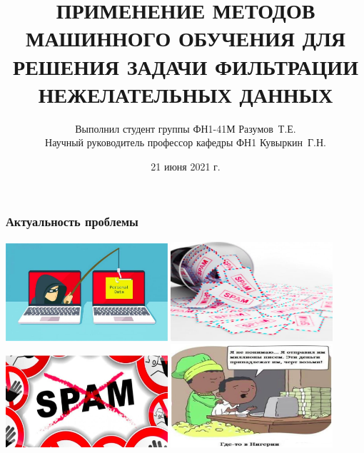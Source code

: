 \documentclass[compress,professionalfont]{beamer}
\title[]{ПРИМЕНЕНИЕ МЕТОДОВ МАШИННОГО ОБУЧЕНИЯ ДЛЯ РЕШЕНИЯ ЗАДАЧИ ФИЛЬТРАЦИИ НЕЖЕЛАТЕЛЬНЫХ ДАННЫХ}
\author{
Выполнил студент группы ФН1-41М Разумов~Т.Е. \\
Научный руководитель профессор кафедры ФН1 Кувыркин~Г.Н.}
\institute[]{МГТУ им. Н.Э.~Баумана}
\date{21 июня 2021 г.}
\begin{document}

\begin{frame}[plain]
	\maketitle
\end{frame}

\begin{frame}
\frametitle{Актуальность проблемы}

\begin{center}
\includegraphics[width=0.45\textwidth]{actual1.jpg}
\includegraphics[width=0.45\textwidth]{actual2.jpg}
\includegraphics[width=0.45\textwidth]{actual3.jpg}
\includegraphics[width=0.45\textwidth]{actual4.jpg}
\end{center}
\end{frame}
\end{document}
